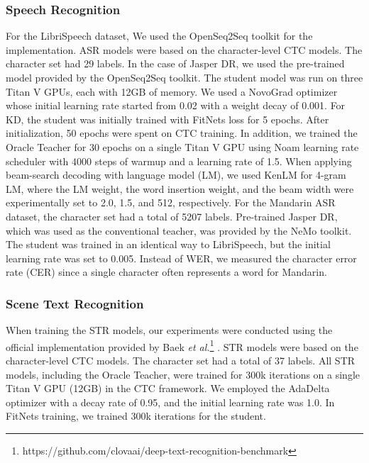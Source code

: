\documentclass[journal]{IEEEtran}
\begin{document}
\subsubsection{Speech Recognition}
For the LibriSpeech dataset, We used the OpenSeq2Seq \cite{openseq2seq} toolkit for the implementation. ASR models were based on the character-level CTC models. 
The character set had 29 labels. In the case of Jasper DR, we used the pre-trained model provided by the OpenSeq2Seq toolkit. The student model was run on three Titan V GPUs, each with 12GB of memory.
We used a NovoGrad optimizer \cite{ginsburg-et-al:scheme} whose initial learning rate started from 0.02 with a weight decay of 0.001. 
For KD, the student was initially trained with FitNets \cite{romero-et-al:scheme} loss for 5 epochs.
After initialization, 50 epochs were spent on CTC training.
In addition, we trained the Oracle Teacher for 30 epochs on a single Titan V GPU using Noam learning rate scheduler with 4000 steps of warmup and a learning rate of 1.5. 
When applying beam-search decoding with language model (LM), we used KenLM \cite{Heafield2011KenLMFA} for 4-gram LM, where the LM weight, the word insertion weight, and the beam width were experimentally set to 2.0, 1.5, and 512, respectively.
For the Mandarin ASR dataset, the character set had a total of 5207 labels. Pre-trained Jasper DR, which was used as the conventional teacher, was provided by the NeMo \cite{nemo:scheme} toolkit. The student was trained in an identical way to LibriSpeech, but the initial learning rate was set to 0.005.
Instead of WER, we measured the character error rate (CER) since a single character often represents a word for Mandarin. 

\subsubsection{Scene Text Recognition}
When training the STR models, our experiments were conducted using the official implementation provided by Baek \textit{et al.}\footnote{https://github.com/clovaai/deep-text-recognition-benchmark} \cite{clova:scheme}. 
STR models were based on the character-level CTC models.
The character set had a total of 37 labels.
All STR models, including the Oracle Teacher, were trained for 300k iterations on a single Titan V GPU (12GB) in the CTC framework.
We employed the AdaDelta optimizer \cite{adadelta:scheme} with a decay rate of 0.95, and the initial learning rate was 1.0.
In FitNets \cite{romero-et-al:scheme} training, we trained 300k iterations for the student.
\end{document}
